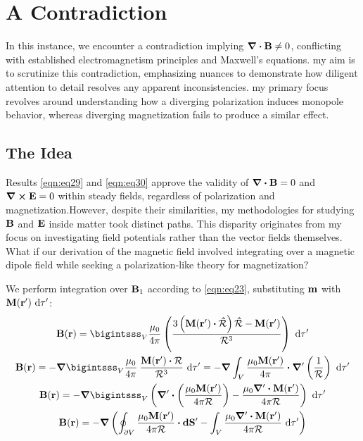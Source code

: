 \documentclass{article}
\numberwithin{equation}{section}
\begin{document}
\section{A Contradiction}
In this instance, we encounter a contradiction implying $\div\vb{B}\neq0$, conflicting with established electromagnetism principles and Maxwell's equations. my aim is to scrutinize this contradiction, emphasizing nuances to demonstrate how diligent attention to detail resolves any apparent inconsistencies. my primary focus revolves around understanding how a diverging polarization induces monopole behavior, whereas diverging magnetization fails to produce a similar effect.
\subsection{The Idea}
Results \eqref{eqn:eq29} and \eqref{eqn:eq30} approve the validity of $\div\vb{B}=0$ and $\curl\vb{E}=0$ within steady fields, regardless of polarization and magnetization.However, despite their similarities, my methodologies for studying $\vb{B}$ and $\vb{E}$ inside matter took distinct paths. This disparity originates from my focus on investigating field potentials rather than the vector fields themselves. What if our derivation of the magnetic field involved integrating over a magnetic dipole field while seeking a polarization-like theory for magnetization?
\par
We perform integration over $\vb{B}_1$ according to \eqref{eqn:eq23}, substituting $\vb{m}$ with $\vb{M}(\vb{r'})\ \dd\tau'$:
\begin{gather}
\vb{B}(\vb{r})=\bigintsss_V \frac{\mu_0}{4\pi}\left( \frac{3\left(\vb{M}(\vb{r'})\vdot\vu{\mathcal{R}}\right)\vu{\mathcal{R}}-\vb{M}(\vb{r'})}{\mathcal{R}^3}\right)\ \dd\tau'\nonumber\\\vb{B}(\vb{r})=-\grad\bigintsss_V\frac{\mu_0}{4\pi}\: \frac{\vb{M}(\vb{r'})\vdot\vb{\mathcal{R}}}{\mathcal{R}^3} \ \dd\tau'=-\grad\int_V \frac{\mu_0 \vb{M}(\vb{r'})}{4\pi}\vdot\grad'\left(\frac{1}{\mathcal{R}}\right)\ \dd\tau'\nonumber\\\vb{B}(\vb{r})=-\grad\bigintsss_V\left( \grad'\vdot\left(\frac{\mu_0\vb{M}(\vb{r'})}{4\pi \mathcal{R}}\right)-\frac{\mu_0 \grad'\vdot\vb{M}(\vb{r'})}{4\pi\mathcal{R}}\right)\ \dd\tau'\nonumber\\\vb{B}(\vb{r})=-\grad\left(\oint_{\partial V} \frac{\mu_0 \vb{M}(\vb{r'})}{4\pi\mathcal{R}} \vdot\vb{dS'}-\int_V \frac{\mu_0\grad'\vdot\vb{M}(\vb{r'})}{4\pi\mathcal{R}}\ \dd\tau' \right)\label{eqn:eq31}
\end{gather}
\end{document}

